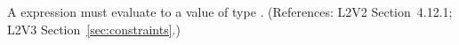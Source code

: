 A \Constraint {} expression must evaluate to a value of type
.  (References: L2V2 Section~4.12.1; L2V3
Section~\ref{sec:constraints}.)
